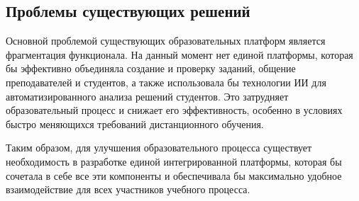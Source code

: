 \subsection*{Проблемы существующих решений}
Основной проблемой существующих образовательных платформ является фрагментация функционала. На данный момент нет единой платформы, которая бы эффективно объединяла создание и проверку заданий, общение преподавателей и студентов, а также использовала бы технологии ИИ для автоматизированного анализа решений студентов. Это затрудняет образовательный процесс и снижает его эффективность, особенно в условиях быстро меняющихся требований дистанционного обучения.

Таким образом, для улучшения образовательного процесса существует необходимость в разработке единой интегрированной платформы, которая бы сочетала в себе все эти компоненты и обеспечивала бы максимально удобное взаимодействие для всех участников учебного процесса.